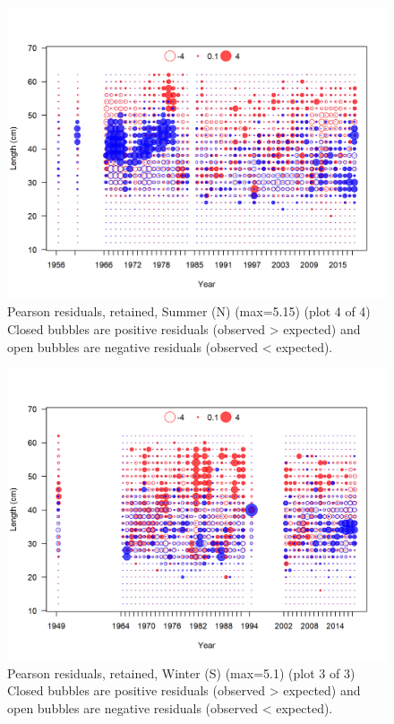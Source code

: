\documentclass[12pt,]{article}
\begin{document}
\begin{figure}
\centering
\includegraphics{r4ss/plots_mod1/comp_lenfit_residsflt2mkt2_page4.png}
\caption{Pearson residuals, retained, Summer (N) (max=5.15) (plot 4 of
4)\\
Closed bubbles are positive residuals (observed \textgreater{} expected)
and open bubbles are negative residuals (observed \textless{} expected).
\label{fig:sn_len_pearson}}
\end{figure}

\begin{figure}
\centering
\includegraphics{r4ss/plots_mod1/comp_lenfit_residsflt3mkt2_page3.png}
\caption{Pearson residuals, retained, Winter (S) (max=5.1) (plot 3 of
3)\\
Closed bubbles are positive residuals (observed \textgreater{} expected)
and open bubbles are negative residuals (observed \textless{} expected).
\label{fig:ws_len_pearson}}
\end{figure}
\end{document}
